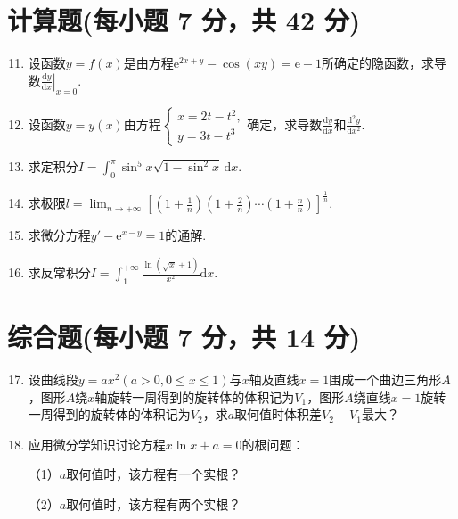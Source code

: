 \documentclass[../Main.tex]{subfiles}
\begin{document}
\section{计算题(每小题 7 分，共 42 分)}
\begin{enumerate}
    \setcounter{enumi}{10}
    \item 设函数$y=f(x)$是由方程$\mathrm{e}^{2x+y}-\cos(xy)=\mathrm{e}-1$所确定的隐函数，求导数$\left
              .\frac{\mathrm{d}y}{\mathrm{d}x}\right|_{x=0}$.
          \vspace{11em}

    \item 设函数$y=y(x)$由方程$\begin{cases}
                  x=2t-t^{2}, \\
                  y=3t-t^{3}
              \end{cases}$确定，求导数$\frac{\mathrm{d}y}{\mathrm{d}x}$和$\frac{\mathrm{d}^{2}
                  y}{\mathrm{d}x^{2}}$.
          \vspace{12em}

    \item 求定积分$I=\int_{0}^{\pi}\sin^{5} x\sqrt{1-\sin^{2} x}\,\mathrm{d}x$.
          \vspace{11em}

    \item 求极限$l=\lim_{n\to+\infty}\left[\left(1+\frac{1}{n}\right)\left(1
                  +\frac{2}{n}\right)\cdots\left(1+\frac{n}{n}\right)\right]^{\frac{1}{n}}$.
          \vspace{11em}

    \item 求微分方程$y'-\mathrm{e}^{x-y}=1$的通解.
          \vspace{12em}

    \item 求反常积分$I=\int_{1}^{+\infty}\frac{\ln\left(\sqrt{x}+1\right)}{x^{2}}
              \mathrm{d}x$.
          \vspace{12em}
\end{enumerate}

\section{综合题(每小题 7 分，共 14 分)}
\begin{enumerate}
    \setcounter{enumi}{16}
    \item 设曲线段$y=ax^{2}(a>0,0\leq x\leq 1)$与$x$轴及直线$x=1$围成一个曲边三角形$A$，图形$A$绕$x$轴旋转一周得到的旋转体的体积记为$V
                  _{1}$，图形$A$绕直线$x=1$旋转一周得到的旋转体的体积记为$V_{2}$，求$a$取何值时体积差$V
                  _{2}-V_{1}$最大？
          \vspace{12em}

    \item 应用微分学知识讨论方程$x\ln x+a=0$的根问题：

          （1）$a$取何值时，该方程有一个实根？

          （2）$a$取何值时，该方程有两个实根？
          \vspace{12em}
\end{enumerate}
\end{document}
